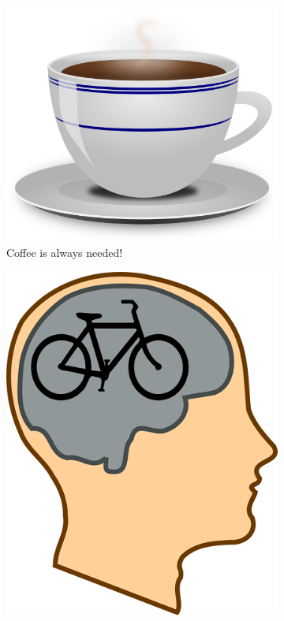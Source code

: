 \begin{landscape}
\begin{figure}
  \centering
  \begin{subfigure}[b]{0.3\textwidth}
    \includegraphics[width=\textwidth]{Cup-of-Coffee}
    \caption{Coffee is always needed!}
    \label{fig:Cup-of-Coffee}   
  \end{subfigure}             
  \begin{subfigure}[b]{0.3\textwidth}
    \includegraphics[width=\textwidth]{Bicycle-for-our-Minds}

\end{subfigure}
\end{figure}
\end{landscape}
